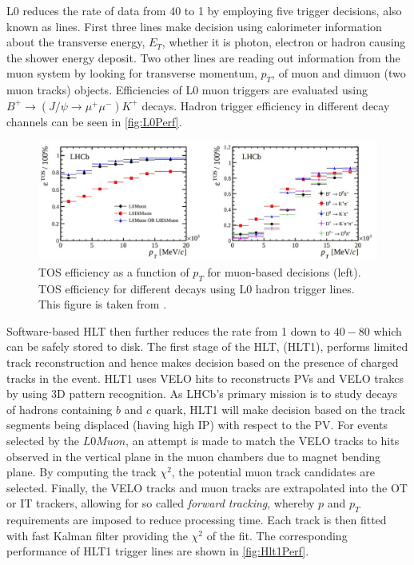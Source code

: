 \Gls{L0} reduces the rate of data from 40 \mhz to 1 \mhz by employing five trigger decisions, also known as lines. First three lines make decision using calorimeter information about the transverse energy, $E_{T}$, whether it is photon, electron or hadron causing the shower energy deposit. Two other lines are reading out information from the muon system by looking for transverse momentum, $p_{T}$, of muon and dimuon (two muon tracks) objects. Efficiencies of L0 muon triggers are evaluated using $B^{+} \rightarrow (J/\psi \rightarrow \mu^{+} \mu^{-}) K^{+}$ decays. Hadron trigger efficiency in different decay channels can be seen in \autoref{fig:L0Perf}. 


\begin{figure}[!h]
	\centering
	\includegraphics[width = 1.0\textwidth]{figs/detector/L0performance.eps}%
	\caption{ \Gls{TOS} efficiency as a function of $p_{T}$ for muon-based decisions (left).         \Gls{TOS} efficiency for different decays using L0 hadron trigger lines. This figure is taken from \cite{LHCb-DP-2012-002}. }  
	\label{fig:L0Perf}
\end{figure}


Software-based \Gls{HLT} then further reduces the rate from 1 \mhz down to $40-80$ \khz which can be safely stored to disk. The first stage of the \Gls{HLT}, (\Gls{HLT1}), performs limited track reconstruction and hence makes decision based on the presence of charged tracks in the event. \Gls{HLT1} uses \Gls{VELO} hits to reconstructs \Gls{PV}s and \Gls{VELO} trakcs by using 3D pattern recognition. As \Gls{LHCb}'s primary mission is to study decays of hadrons containing $b$ and $c$ quark, \Gls{HLT1} will make decision based on the track segments being displaced (having high \Gls{IP}) with respect to the \Gls{PV}. For events selected by the $L0Muon$, an attempt is made to match the \Gls{VELO} tracks to hits observed in the vertical plane in the muon chambers due to magnet bending plane. By computing the track $\chi^2$, the potential muon track candidates are selected. Finally, the \Gls{VELO} tracks and muon tracks are extrapolated into the \Gls{OT} or \Gls{IT} trackers, allowing for so called \textit{forward tracking}, whereby $p$ and $p_{T}$ requirements are imposed to reduce processing time. Each track is then fitted with fast Kalman filter providing the $\chi^2$ of the fit. The corresponding performance of \Gls{HLT1} trigger lines are shown in \autoref{fig:Hlt1Perf}.


